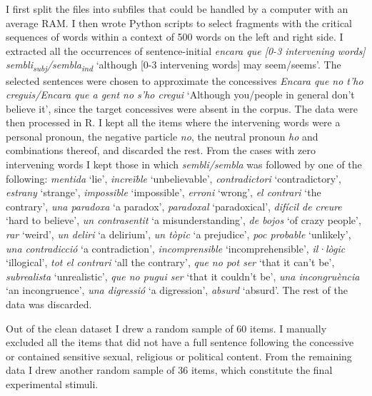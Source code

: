 I  first split the files into subfiles that could be handled by a computer with an average RAM. I then wrote Python scripts to select fragments with  the critical sequences of words within a context of 500 words on the left and right side.  I extracted all the occurrences of sentence-initial \textit{encara que \emph{{[}0-3 intervening words{]}} sembli\textsubscript{subj}/sembla\textsubscript{ind}}  `although {[}0-3 intervening words{]} may seem/seems'. The selected sentences were chosen to approximate the concessives \textit{Encara que no t'ho creguis/Encara que a gent no s'ho cregui} `Although you/people in general don't believe it', since the target concessives were absent in the corpus. The data were then processed  in R. I kept all the items where the intervening words were a personal pronoun, the negative particle \textit{no}, the neutral pronoun \textit{ho} and combinations thereof, and discarded the rest. From the cases with zero intervening words I kept those in which \textit{sembli/sembla}  was followed by one of the following: \textit{mentida} `lie', \textit{increïble} `unbelievable', \textit{contradictori} `contradictory', \textit{estrany} `strange', \textit{impossible} `impossible', \textit{erroni} `wrong', \textit{el contrari} `the contrary', \textit{una paradoxa} `a paradox', \textit{paradoxal} `paradoxical', \textit{difícil de creure} `hard to believe', \textit{un contrasentit} `a misunderstanding', \textit{de bojos} `of crazy people', \textit{rar} `weird', \textit{un deliri} `a delirium', \textit{un tòpic} `a prejudice',  \textit{poc probable} `unlikely', \textit{una contradicció} `a contradiction', \textit{incomprensible} `incomprehensible', \textit{il·lògic} `illogical', \textit{tot el contrari} `all the contrary', \textit{que no pot ser} `that it can't be', \textit{subrealista} `unrealistic', \textit{que no pugui ser} `that it couldn't be', \textit{una incongruència} `an incongruence', \textit{una digressió} `a digression', \textit{absurd} `absurd'. The rest of the data was discarded. 

Out of the clean dataset I drew a random sample of 60 items. I manually excluded all the items that did not have a full sentence following the concessive or contained sensitive  sexual, religious or political content. From the remaining data I drew another random sample of 36 items, which constitute the final experimental stimuli. 

